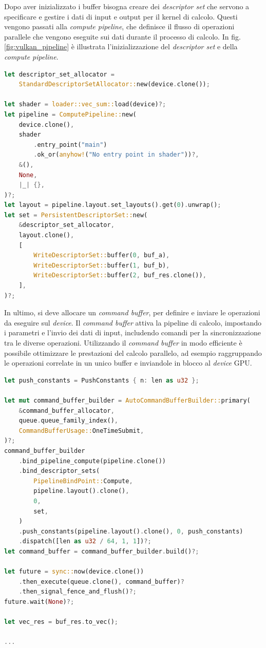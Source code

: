Dopo aver inizializzato i buffer bisogna creare dei \textit{descriptor set} che servono a specificare e gestire i dati di input e output per il kernel di calcolo. Questi vengono passati alla \textit{compute pipeline}, che definisce il flusso di operazioni parallele che vengono eseguite sui dati durante il processo di calcolo. In  fig. \ref{fig:vulkan_pipeline} è illustrata l'inizializzazione del \textit{descriptor set} e della \textit{compute pipeline}.

\vspace{5mm}
\begin{lstlisting}[language=Rust, caption=Inizializzazione della compute pipeline, label=lis:vulkan_pipeline]
let descriptor_set_allocator =
    StandardDescriptorSetAllocator::new(device.clone());

let shader = loader::vec_sum::load(device)?;
let pipeline = ComputePipeline::new(
    device.clone(),
    shader
        .entry_point("main")
        .ok_or(anyhow!("No entry point in shader"))?,
    &(),
    None,
    |_| {},
)?;
let layout = pipeline.layout.set_layouts().get(0).unwrap();
let set = PersistentDescriptorSet::new(
    &descriptor_set_allocator,
    layout.clone(),
    [
        WriteDescriptorSet::buffer(0, buf_a),
        WriteDescriptorSet::buffer(1, buf_b),
        WriteDescriptorSet::buffer(2, buf_res.clone()),
    ],
)?;
\end{lstlisting}
\vspace{5mm}

In ultimo, si deve allocare un \textit{command buffer}, per definire e inviare le operazioni da eseguire sul \textit{device}. Il \textit{command buffer} attiva la pipeline di calcolo, impostando i parametri e l'invio dei dati di input, includendo comandi per la sincronizzazione tra le diverse operazioni. Utilizzando il \textit{command buffer} in modo efficiente è possibile ottimizzare le prestazioni del calcolo parallelo, ad esempio raggruppando le operazioni correlate in un unico buffer e inviandole in blocco al \textit{device} \gls{GPU}.

\newpage
\vspace{5mm}
\begin{lstlisting}[language=Rust, caption=Command buffer e dispatch, label=lis:vulkan_dispatch]
let push_constants = PushConstants { n: len as u32 };

let mut command_buffer_builder = AutoCommandBufferBuilder::primary(
    &command_buffer_allocator,
    queue.queue_family_index(),
    CommandBufferUsage::OneTimeSubmit,
)?;
command_buffer_builder
    .bind_pipeline_compute(pipeline.clone())
    .bind_descriptor_sets(
        PipelineBindPoint::Compute,
        pipeline.layout().clone(),
        0,
        set,
    )
    .push_constants(pipeline.layout().clone(), 0, push_constants)
    .dispatch([len as u32 / 64, 1, 1])?;
let command_buffer = command_buffer_builder.build()?;

let future = sync::now(device.clone())
    .then_execute(queue.clone(), command_buffer)?
    .then_signal_fence_and_flush()?;
future.wait(None)?;

let vec_res = buf_res.to_vec();

...
\end{lstlisting}
\vspace{5mm}

